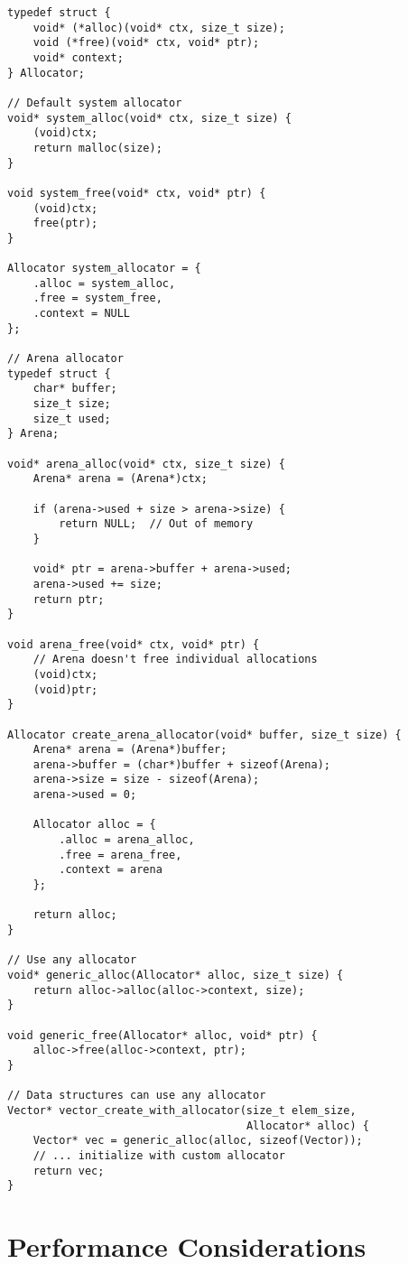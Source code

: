 \begin{lstlisting}
typedef struct {
    void* (*alloc)(void* ctx, size_t size);
    void (*free)(void* ctx, void* ptr);
    void* context;
} Allocator;

// Default system allocator
void* system_alloc(void* ctx, size_t size) {
    (void)ctx;
    return malloc(size);
}

void system_free(void* ctx, void* ptr) {
    (void)ctx;
    free(ptr);
}

Allocator system_allocator = {
    .alloc = system_alloc,
    .free = system_free,
    .context = NULL
};

// Arena allocator
typedef struct {
    char* buffer;
    size_t size;
    size_t used;
} Arena;

void* arena_alloc(void* ctx, size_t size) {
    Arena* arena = (Arena*)ctx;

    if (arena->used + size > arena->size) {
        return NULL;  // Out of memory
    }

    void* ptr = arena->buffer + arena->used;
    arena->used += size;
    return ptr;
}

void arena_free(void* ctx, void* ptr) {
    // Arena doesn't free individual allocations
    (void)ctx;
    (void)ptr;
}

Allocator create_arena_allocator(void* buffer, size_t size) {
    Arena* arena = (Arena*)buffer;
    arena->buffer = (char*)buffer + sizeof(Arena);
    arena->size = size - sizeof(Arena);
    arena->used = 0;

    Allocator alloc = {
        .alloc = arena_alloc,
        .free = arena_free,
        .context = arena
    };

    return alloc;
}

// Use any allocator
void* generic_alloc(Allocator* alloc, size_t size) {
    return alloc->alloc(alloc->context, size);
}

void generic_free(Allocator* alloc, void* ptr) {
    alloc->free(alloc->context, ptr);
}

// Data structures can use any allocator
Vector* vector_create_with_allocator(size_t elem_size,
                                     Allocator* alloc) {
    Vector* vec = generic_alloc(alloc, sizeof(Vector));
    // ... initialize with custom allocator
    return vec;
}
\end{lstlisting}

\section{Performance Considerations}

